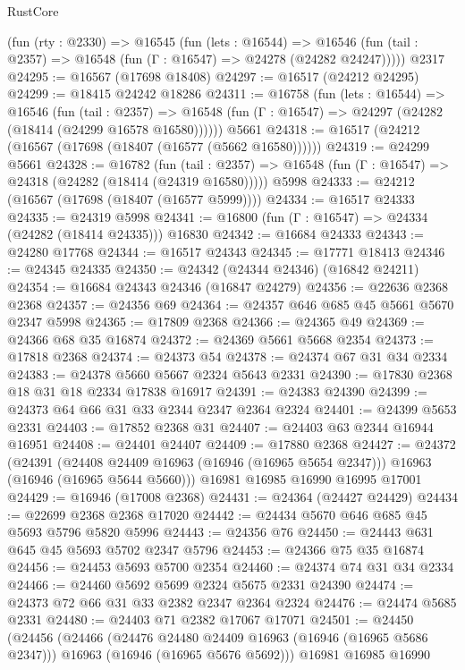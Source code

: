 \begin{lexlean}{RustCore}
\begin{coremodule}
    (fun (rty : @2330) =>
    @16545
      (fun (lets : @16544) =>
      @16546 (fun (tail : @2357) => @16548 (fun (Γ : @16547) => @24278 (@24282 @24247)))))
    @2317
@24295 := @16567 (@17698 @18408)
@24297 := @16517 (@24212 @24295)
@24299 := @18415 @24242 @18286
@24311 := @16758
    (fun (lets : @16544) =>
    @16546
      (fun (tail : @2357) =>
      @16548 (fun (Γ : @16547) => @24297 (@24282 (@18414 (@24299 @16578 @16580))))))
    @5661
@24318 := @16517 (@24212 (@16567 (@17698 (@18407 (@16577 (@5662 @16580))))))
@24319 := @24299 @5661
@24328 := @16782
    (fun (tail : @2357) => @16548 (fun (Γ : @16547) => @24318 (@24282 (@18414 (@24319 @16580)))))
    @5998
@24333 := @24212 (@16567 (@17698 (@18407 (@16577 @5999))))
@24334 := @16517 @24333
@24335 := @24319 @5998
@24341 := @16800 (fun (Γ : @16547) => @24334 (@24282 (@18414 @24335))) @16830
@24342 := @16684 @24333
@24343 := @24280 @17768
@24344 := @16517 @24343
@24345 := @17771 @18413
@24346 := @24345 @24335
@24350 := @24342 (@24344 @24346) (@16842 @24211)
@24354 := @16684 @24343 @24346 (@16847 @24279)
@24356 := @22636 @2368 @2368
@24357 := @24356 @69
@24364 := @24357 @646 @685 @45 @5661 @5670 @2347 @5998
@24365 := @17809 @2368
@24366 := @24365 @49
@24369 := @24366 @68 @35 @16874
@24372 := @24369 @5661 @5668 @2354
@24373 := @17818 @2368
@24374 := @24373 @54
@24378 := @24374 @67 @31 @34 @2334
@24383 := @24378 @5660 @5667 @2324 @5643 @2331
@24390 := @17830 @2368 @18 @31 @18 @2334 @17838 @16917
@24391 := @24383 @24390
@24399 := @24373 @64 @66 @31 @33 @2344 @2347 @2364 @2324
@24401 := @24399 @5653 @2331
@24403 := @17852 @2368 @31
@24407 := @24403 @63 @2344 @16944 @16951
@24408 := @24401 @24407
@24409 := @17880 @2368
@24427 := @24372
    (@24391
      (@24408 @24409 @16963 (@16946 (@16965 @5654 @2347)))
      @16963
      (@16946 (@16965 @5644 @5660)))
    @16981
    @16985
    @16990
    @16995
    @17001
@24429 := @16946 (@17008 @2368)
@24431 := @24364 (@24427 @24429)
@24434 := @22699 @2368 @2368 @17020
@24442 := @24434 @5670 @646 @685 @45 @5693 @5796 @5820 @5996
@24443 := @24356 @76
@24450 := @24443 @631 @645 @45 @5693 @5702 @2347 @5796
@24453 := @24366 @75 @35 @16874
@24456 := @24453 @5693 @5700 @2354
@24460 := @24374 @74 @31 @34 @2334
@24466 := @24460 @5692 @5699 @2324 @5675 @2331 @24390
@24474 := @24373 @72 @66 @31 @33 @2382 @2347 @2364 @2324
@24476 := @24474 @5685 @2331
@24480 := @24403 @71 @2382 @17067 @17071
@24501 := @24450
    (@24456
      (@24466
        (@24476 @24480 @24409 @16963 (@16946 (@16965 @5686 @2347)))
        @16963
        (@16946 (@16965 @5676 @5692)))
      @16981
      @16985
      @16990

\end{coremodule}
\end{lexlean}

